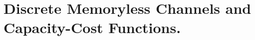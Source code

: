 
\chapter{Discrete Memoryless Channels and Capacity-Cost Functions.} %

\label{Chapter1} %




%
%
%
%
%
